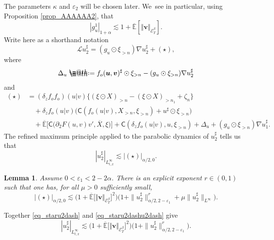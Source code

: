 \documentclass[10pt]{amsart}
\makeatletter
\newtheorem{lem}[thm]{Lemma}
\theoremstyle{definition}
\let\epsilon\varepsilon
\newcommand\bbE{\mathbb{E}}
\newcommand{\mcE}{\mathcal{E}}
\newcommand{\bsu}{\boldsymbol{u}}
\newcommand{\bsv}{\boldsymbol{v}}
\newcommand*{\defeq}{\mathrel{\rlap{%
\raisebox{0.3ex}{$\m@th\cdot$}}%
\raisebox{-0.3ex}{$\m@th\cdot$}}%
=}
\newcommand{\norme}[1]{\Vert #1 \Vert}
\newcommand{\scrL}{\mathscr{L}}
\makeatother
\begin{document}
The parameters $\kappa$ and $\epsilon_2$ will be chosen later. We~see in particular, using Proposition \ref{prop_AAAAAA2}, that
\begin{equation}\label{eq_estimeegu1bis}
| g_u^1 |_{1 + \alpha} \lesssim 1 + \overline{\bbE}[\norme{\bsv}_{\mcE^\beta_T}].
\end{equation}
Write here as a shorthand notation
\[
\scrL u^{\sharp}_2 = (g_u \odot \xi_{> n}) \nabla u_2^{\sharp} + (\star),
\]
where
\[
\Delta_u \defeq f_o(\bsu,\bsv)^{\sharp} \odot \xi_{> n} - (g_u \odot \xi_{> n}) \nabla u_2^{\sharp}
\]
and
\begin{align*}
(\star) &= (\delta_z f_o f_o) (u\vert v) \{ (\xi\odot X)_{> n} - (\xi\odot X)_{> n_1} + \zeta_n \} \\
&\quad+ \delta_zf_o (u\vert v) \bigl(\mathsf{C} (f_o (u\vert v), X_{> n}, \xi_{> n}) + u^{\sharp} \odot \xi_{> n}\bigr)
\\
&\quad+ \overline{\bbE}\bigl[\mathsf{C}\bigl(\partial_2 F(u,v)v', \overline{X},\xi\bigr)\bigr]
+ \mathsf{C} (\delta_zf_o (u\vert v), u, \xi_{> n}) + \Delta_u + (g_u\odot \xi_{> n}) \nabla u_1^{\sharp}.
\end{align*}
The refined maximum principle \cite[Th.\,4.2]{ShenZhuZhu} applied to the parabolic dynamics of $u_2^{\sharp}$ tells us that
\begin{equation} \label{eq_staru2dash}
| u_2^{\sharp} |_{L^{\infty}_{t, x}} \lesssim | (\star) |_{\alpha / 2, 0}.
\end{equation}

\begin{lem} \label{lem_AAAAAA5} Assume $0 < \epsilon_1 < 2 - 2 \alpha$. There
is an explicit exponent $r\in(0,1)$ such that one has, for all $\mu>0$
sufficiently small,
\begin{equation} \label{eq_staru2dashu2dash}
| (\star) |_{\alpha / 2, 0} \lesssim \bigl(1+\overline{\bbE}\bigl[\norme{\bsv}_{\mcE^\beta_T}\bigr]^2\bigr) \bigl( 1 + \| u_2^{\sharp} \|^r_{\alpha / 2, 2 - \epsilon_1} + \mu \| u_2^{\sharp} \|_{L^{\infty}} \bigr).
\end{equation}
\end{lem}

Together \eqref{eq_staru2dash} and \eqref{eq_staru2dashu2dash} give
\[
| u_2^{\sharp} |_{L^{\infty}_{t, x}} \lesssim \bigl(1+\overline{\bbE}\bigl[\norme{\bsv}_{\mcE^\beta_T}\bigr]^2\bigr) \bigl( 1 + \| u_2^{\sharp} \|^r_{\alpha / 2, 2 - \epsilon_1} \bigr).
\]
\end{document}
